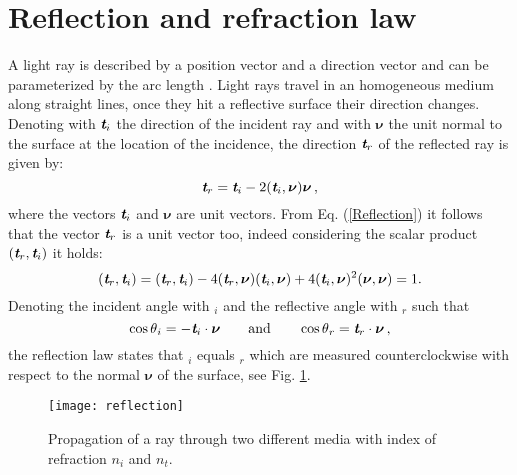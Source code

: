 \section{Reflection and refraction law}
A light ray is described by a position vector  and a direction vector  and can be parameterized by the arc length .
Light rays travel in an homogeneous medium along straight lines, once they hit a reflective surface their direction changes.
 Denoting with $\textit{\textbf{t}}_i$ the direction of the incident ray and with $\boldsymbol{\nu}$ the unit normal to the surface at the location of the incidence, the direction $\textit{\textbf{t}}_r$ of the reflected ray is given by:
 \begin{equation}\label{Reflection}
  \textit{\textbf{t}}_r = \textit{\textbf{t}}_i-2(\textit{\textbf{t}}_i,\boldsymbol{\nu})\boldsymbol{\nu}\,,
\end{equation}
where the vectors $\textit{\textbf{t}}_i$ and $\boldsymbol{\nu}$ are unit vectors. 
From Eq. (\ref{Reflection}) it follows that the vector  $\textit{\textbf{t}}_r$ is a unit vector too, indeed considering the scalar product $(\textit{\textbf{t}}_r,\textit{\textbf{t}}_i)$ it holds:
\begin{equation}\label{unit_vector}
(\textit{\textbf{t}}_r,\textit{\textbf{t}}_i) = (\textit{\textbf{t}}_r,\textit{\textbf{t}}_i) - 4(\textit{\textbf{t}}_r,\boldsymbol{\nu})(\textit{\textbf{t}}_i,\boldsymbol{\nu})+
4(\textit{\textbf{t}}_i,\boldsymbol{\nu})^2(\boldsymbol{\nu},\boldsymbol{\nu})=1 .
\end{equation} 
Denoting the incident angle with \myangle$_i$ and the reflective angle with \myangle$_r$ such that
\begin{equation}
\cos{\mbox{$\theta$}_i} = -\textit{\textbf{t}}_i\cdot \boldsymbol{\nu} \qquad \mbox{and} \qquad \cos{\mbox{$\theta$}_r} = \textit{\textbf{t}}_r \cdot\boldsymbol{\nu}\,,
\end{equation}
the reflection law states that \myangle$_i$ equals \myangle$_r$ which are measured counterclockwise with respect to the normal $\boldsymbol{\nu}$ of the surface, see Fig. \ref{fig:Snell}.
\begin{figure}[h]
 \label{fig:Snell}
     \begin{center}
     \texttt{[image: reflection]}
     \end{center}
     \caption{\footnotesize{Propagation of a ray through two different media with index of refraction $n_i$ and $n_t$.}}%
\label{fig:Snell}
 \end{figure}
